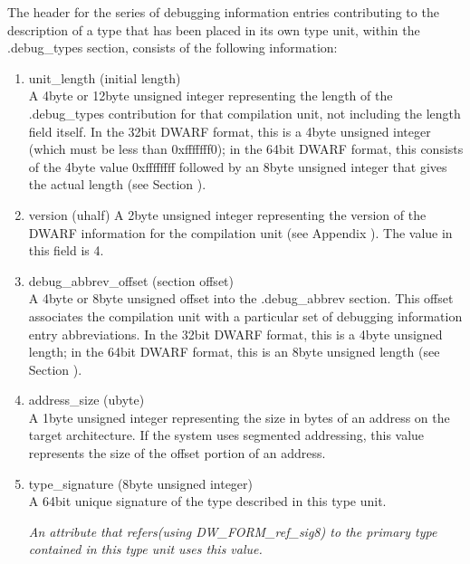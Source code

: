 The header for the series of debugging information entries
contributing to the description of a type that has been
placed in its own type unit, within the .debug\_types section,
consists of the following information:

\begin{enumerate}[1.]

\item unit\_length (initial length) \\
A 4\dash byte or 12\dash byte unsigned integer representing the length
of the .debug\_types contribution for that compilation unit,
not including the length field itself. In the 32\dash bit DWARF
format, this is a 4\dash byte unsigned integer (which must be
less than 0xfffffff0); in the 64\dash bit DWARF format, this
consists of the 4\dash byte value 0xffffffff followed by an 
8\dash byte unsigned integer that gives the actual length
(see Section ).

\item  version (uhalf)
A 2\dash byte unsigned integer representing the version of the
DWARF information for the compilation unit 
(see Appendix ). 
The value in this field is 4.

\item debug\_abbrev\_offset (section offset) \\
A 4\dash byte or 8\dash byte unsigned offset into the .debug\_abbrev
section. This offset associates the compilation unit with a
particular set of debugging information entry abbreviations. In
the 32\dash bit DWARF format, this is a 4\dash byte unsigned length;
in the 64\dash bit DWARF format, this is an 8\dash byte unsigned length
(see Section ).

\item address\_size (ubyte) \\
A 1\dash byte unsigned integer representing the size in bytes of
an address on the target architecture. If the system uses
segmented addressing, this value represents the size of the
offset portion of an address.


\item type\_signature (8\dash byte unsigned integer) \\
A 64\dash bit unique signature of the type described in this type
unit.  

\textit{An attribute that refers(using DW\-\_FORM\-\_ref\-\_sig8) to
the primary type contained in this type unit uses this value.}



\end{enumerate}

